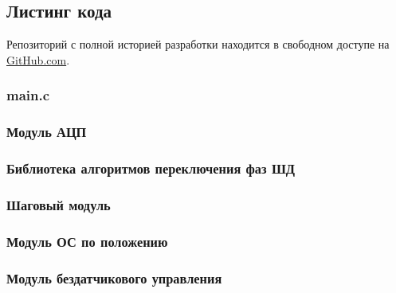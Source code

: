 \clearpage
\subsection{Листинг кода}

Репозиторий с полной историей разработки находится в свободном доступе на
\href{https://github.com/TheGreenBox/sattelite_step_drive}{GitHub.com}.

\subsubsection{main.c}
\label{module_main}


\newpage
\subsubsection{Модуль АЦП}
\label{module_adc}



\newpage
\subsubsection{Библиотека алгоритмов переключения фаз ШД}
\label{module_algo_types}



\newpage
\subsubsection{Шаговый модуль}
\label{module_control_algo}



\newpage
\subsubsection{Модуль ОС по положению}
\label{module_control_modules_feedback_control}



\newpage
\subsubsection{Модуль бездатчикового управления}
\label{module_control_modules_synchronized_control}



